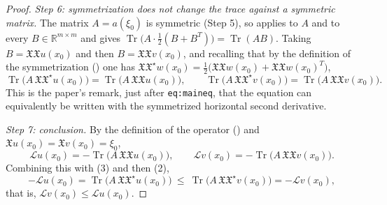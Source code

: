 \begin{proof}
\emph{Step 6: symmetrization does not change the trace against a symmetric matrix.} The matrix
$A=a(\xi_0)$ is symmetric (Step 5), so  applies to $A$ and to every
$B\in\mathbb{R}^{m\times m}$ and gives
$\operatorname{Tr}\big(A\cdot\tfrac12(B+B^T)\big)=\operatorname{Tr}(AB)$. Taking
$B=\mathfrak{X}\mathfrak{X}u(x_0)$ and then $B=\mathfrak{X}\mathfrak{X}v(x_0)$, and recalling that
by the definition of the symmetrization () one has
$\mathfrak{X}\mathfrak{X}^\star w(x_0)=\tfrac12\big(\mathfrak{X}\mathfrak{X}w(x_0)
+\mathfrak{X}\mathfrak{X}w(x_0)^T\big)$,
\begin{equation*}\operatorname{Tr}\Big(A\,\mathfrak{X}\mathfrak{X}^\star u(x_0)\Big)
=\operatorname{Tr}\Big(A\,\mathfrak{X}\mathfrak{X}u(x_0)\Big),\qquad
\operatorname{Tr}\Big(A\,\mathfrak{X}\mathfrak{X}^\star v(x_0)\Big)
=\operatorname{Tr}\Big(A\,\mathfrak{X}\mathfrak{X}v(x_0)\Big). \tag{3}\end{equation*}
This is the paper's remark, just after \texttt{eq:maineq}, that the equation can equivalently be
written with the symmetrized horizontal second derivative.

\emph{Step 7: conclusion.} By the definition of the operator () and
$\mathfrak{X}u(x_0)=\mathfrak{X}v(x_0)=\xi_0$,
$$\mathcal{L}u(x_0)=-\operatorname{Tr}\Big(A\,\mathfrak{X}\mathfrak{X}u(x_0)\Big),\qquad
\mathcal{L}v(x_0)=-\operatorname{Tr}\Big(A\,\mathfrak{X}\mathfrak{X}v(x_0)\Big).$$
Combining this with (3) and then (2),
$$-\mathcal{L}u(x_0)=\operatorname{Tr}\Big(A\,\mathfrak{X}\mathfrak{X}^\star u(x_0)\Big)
\ \leq\ \operatorname{Tr}\Big(A\,\mathfrak{X}\mathfrak{X}^\star v(x_0)\Big)=-\mathcal{L}v(x_0),$$
that is, $\mathcal{L}v(x_0)\leq\mathcal{L}u(x_0)$.
\end{proof}
